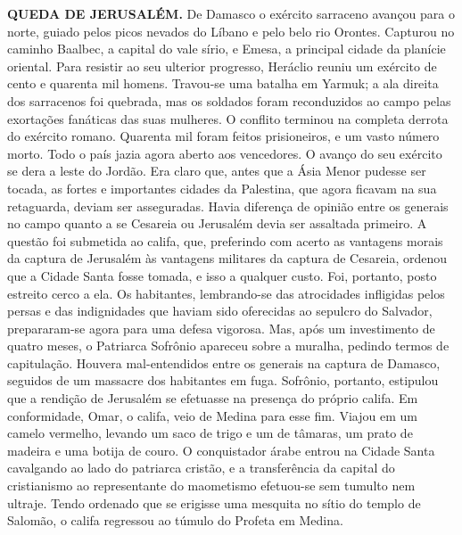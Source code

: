 \documentclass[11pt,a5paper,twoside,openany]{book}
\begin{document}
\textbf{QUEDA DE JERUSALÉM.} De Damasco o exército sarraceno avançou para o norte, guiado pelos picos nevados do Líbano e pelo belo rio Orontes. Capturou no caminho Baalbec, a capital do vale sírio, e Emesa, a principal cidade da planície oriental. Para resistir ao seu ulterior progresso, Heráclio reuniu um exército de cento e quarenta mil homens. Travou-se uma batalha em Yarmuk; a ala direita dos sarracenos foi quebrada, mas os soldados foram reconduzidos ao campo pelas exortações fanáticas das suas mulheres. O conflito terminou na completa derrota do exército romano. Quarenta mil foram feitos prisioneiros, e um vasto número morto. Todo o país jazia agora aberto aos vencedores. O avanço do seu exército se dera a leste do Jordão. Era claro que, antes que a Ásia Menor pudesse ser tocada, as fortes e importantes cidades da Palestina, que agora ficavam na sua retaguarda, deviam ser asseguradas. Havia diferença de opinião entre os generais no campo quanto a se Cesareia ou Jerusalém devia ser assaltada primeiro. A questão foi submetida ao califa, que, preferindo com acerto as vantagens morais da captura de Jerusalém às vantagens militares da captura de Cesareia, ordenou que a Cidade Santa fosse tomada, e isso a qualquer custo. Foi, portanto, posto estreito cerco a ela. Os habitantes, lembrando-se das atrocidades infligidas pelos persas e das indignidades que haviam sido oferecidas ao sepulcro do Salvador, prepararam-se agora para uma defesa vigorosa. Mas, após um investimento de quatro meses, o Patriarca Sofrônio apareceu sobre a muralha, pedindo termos de capitulação. Houvera mal-entendidos entre os generais na captura de Damasco, seguidos de um massacre dos habitantes em fuga. Sofrônio, portanto, estipulou que a rendição de Jerusalém se efetuasse na presença do próprio califa. Em conformidade, Omar, o califa, veio de Medina para esse fim. Viajou em um camelo vermelho, levando um saco de trigo e um de tâmaras, um prato de madeira e uma botija de couro. O conquistador árabe entrou na Cidade Santa cavalgando ao lado do patriarca cristão, e a transferência da capital do cristianismo ao representante do maometismo efetuou-se sem tumulto nem ultraje. Tendo ordenado que se erigisse uma mesquita no sítio do templo de Salomão, o califa regressou ao túmulo do Profeta em Medina.
\end{document}
